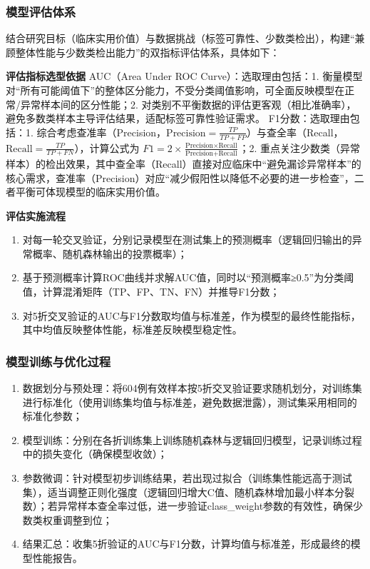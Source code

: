 \documentclass[withoutpreface,bwprint]{cumcmthesis} %
\begin{document}
\subsubsection{模型评估体系}
结合研究目标（临床实用价值）与数据挑战（标签可靠性、少数类检出），构建“兼顾整体性能与少数类检出能力”的双指标评估体系，具体如下：

\textbf{评估指标选型依据}
AUC（Area Under ROC Curve）：选取理由包括：1. 衡量模型对“所有可能阈值下”的整体区分能力，不受分类阈值影响，可全面反映模型在正常/异常样本间的区分性能；2. 对类别不平衡数据的评估更客观（相比准确率），避免多数类样本主导评估结果，适配标签可靠性验证需求。  
F1分数：选取理由包括：1. 综合考虑查准率（Precision，$ \text{Precision} = \frac{TP}{TP+FP} $）与查全率（Recall，$ \text{Recall} = \frac{TP}{TP+FN} $），计算公式为 $ F1 = 2 \times \frac{\text{Precision} \times \text{Recall}}{\text{Precision} + \text{Recall}} $；2. 重点关注少数类（异常样本）的检出效果，其中查全率（Recall）直接对应临床中“避免漏诊异常样本”的核心需求，查准率（Precision）对应“减少假阳性以降低不必要的进一步检查”，二者平衡可体现模型的临床实用价值。

\textbf{评估实施流程}
\begin{enumerate}
    \item 对每一轮交叉验证，分别记录模型在测试集上的预测概率（逻辑回归输出的异常概率、随机森林输出的投票概率）；
    \item 基于预测概率计算ROC曲线并求解AUC值，同时以“预测概率≥0.5”为分类阈值，计算混淆矩阵（TP、FP、TN、FN）并推导F1分数； 
    \item 对5折交叉验证的AUC与F1分数取均值与标准差，作为模型的最终性能指标，其中均值反映整体性能，标准差反映模型稳定性。
\end{enumerate}

\subsubsection{模型训练与优化过程}
\begin{enumerate}
    \item 数据划分与预处理：将604例有效样本按5折交叉验证要求随机划分，对训练集进行标准化（使用训练集均值与标准差，避免数据泄露），测试集采用相同的标准化参数；  
    \item 模型训练：分别在各折训练集上训练随机森林与逻辑回归模型，记录训练过程中的损失变化（确保模型收敛）；
    \item 参数微调：针对模型初步训练结果，若出现过拟合（训练集性能远高于测试集），适当调整正则化强度（逻辑回归增大C值、随机森林增加最小样本分裂数）；若异常样本查全率过低，进一步验证class\_weight参数的有效性，确保少数类权重调整到位；
    \item 结果汇总：收集5折验证的AUC与F1分数，计算均值与标准差，形成最终的模型性能报告。
\end{enumerate}
\end{document}

